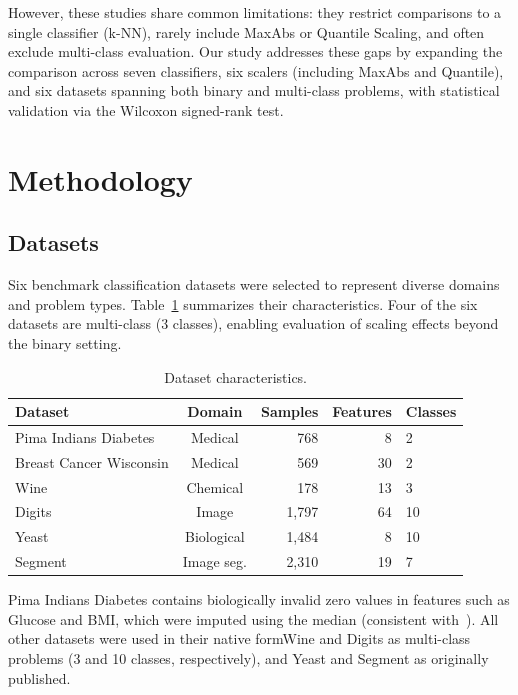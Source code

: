 \documentclass[12pt,a4paper]{article}
\begin{document}
However, these studies share common limitations: they restrict comparisons to a single classifier (k-NN), rarely include MaxAbs or Quantile Scaling, and often exclude multi-class evaluation. Our study addresses these gaps by expanding the comparison across seven classifiers, six scalers (including MaxAbs and Quantile), and six datasets spanning both binary and multi-class problems, with statistical validation via the Wilcoxon signed-rank test.

\section{Methodology}
\label{sec:method}

\subsection{Datasets}
\label{sec:datasets}

Six benchmark classification datasets were selected to represent diverse domains and problem types. Table~\ref{tbl:datasets} summarizes their characteristics. Four of the six datasets are multi-class (3 classes), enabling evaluation of scaling effects beyond the binary setting.

\begin{table}[ht]
\centering
\caption{Dataset characteristics.}
\label{tbl:datasets}
\begin{tabular}{lcrrl}
\toprule
Dataset & Domain & Samples & Features & Classes \\
\midrule
Pima Indians Diabetes  & Medical     & 768  &  8 & 2 \\
Breast Cancer Wisconsin & Medical    & 569  & 30 & 2 \\
Wine                   & Chemical    & 178  & 13 & 3 \\
Digits                 & Image       & 1,797& 64 & 10 \\
Yeast                  & Biological  & 1,484&  8 & 10 \\
Segment                & Image seg.  & 2,310& 19 & 7 \\
\bottomrule
\end{tabular}
\end{table}

Pima Indians Diabetes contains biologically invalid zero values in features such as Glucose and BMI, which were imputed using the median (consistent with~\cite{pristyanto2022diabetes}). All other datasets were used in their native form\textemdash Wine and Digits as multi-class problems (3 and 10 classes, respectively), and Yeast and Segment as originally published.
\end{document}
